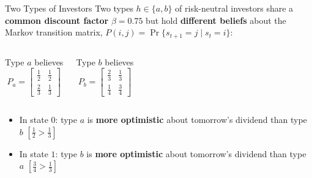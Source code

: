 \documentclass[aspectratio=169]{beamer}
\newcommand{\Pa}{P_a}
\newcommand{\Pb}{P_b}
\begin{document}
\begin{frame}{Two Types of Investors}
  Two types $h \in \{a,b\}$ of risk-neutral investors share a \textbf{common
  discount factor} $\beta = 0.75$ but hold \textbf{different beliefs} about
  the Markov transition matrix, $P(i,j) = \Pr\{s_{t+1}=j \mid s_t=i\}$:

  \bigskip
  \begin{columns}
    \begin{block}{Type $a$ believes}
      \[
        \Pa =
        \begin{bmatrix}
          \tfrac{1}{2} & \tfrac{1}{2} \\[4pt]
          \tfrac{2}{3} & \tfrac{1}{3}
        \end{bmatrix}
      \]
    \end{block}

    \begin{block}{Type $b$ believes}
      \[
        \Pb =
        \begin{bmatrix}
          \tfrac{2}{3} & \tfrac{1}{3} \\[4pt]
          \tfrac{1}{4} & \tfrac{3}{4}
        \end{bmatrix}
      \]
    \end{block}
  \end{columns}

  \bigskip
  \begin{itemize}
    \item In state $0$: type $a$ is \textcolor{qegreen}{\textbf{more optimistic}}
          about tomorrow's dividend than type $b$
          \quad $[\tfrac{1}{2} > \tfrac{1}{3}]$
    \item In state $1$: type $b$ is \textcolor{qegreen}{\textbf{more optimistic}}
          about tomorrow's dividend than type $a$
          \quad $[\tfrac{3}{4} > \tfrac{1}{3}]$
  \end{itemize}
\end{frame}
\end{document}
